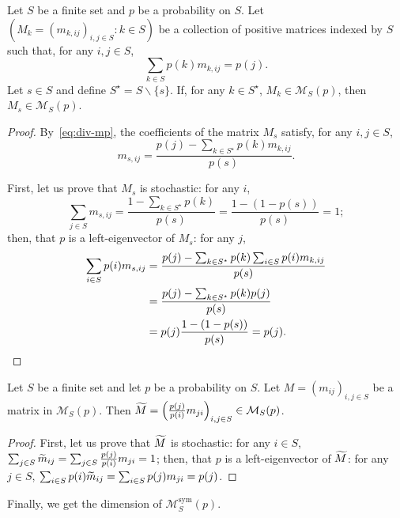 \documentclass[AHL,Unicode,longabstracts]{cedram}
\let\oldtilde\tilde
\renewcommand*{\tilde}[1]{\mathchoice{\widetilde{#1}}{\widetilde{#1}}{\oldtilde{#1}}{\oldtilde{#1}}}
\newcounter{a}
\DeclareMathOperator{\sym}{sym}
\begin{document}
\begin{lemm}\label{lem:div-mp}
Let $S$ be a finite set and $p$ be a probability on $S$. Let $(M_k= (m_{k,ij})_{i,j \in S}:k\in S)$ be a collection of positive matrices indexed by $S$ such that, for any $i,j \in S$,
\begin{equation}\label{eq:div-mp}
\sum_{k \in S} p(k) m_{k,ij} = p(j).
\end{equation}
Let $s \in S$ and define $S^\star = S \backslash \{s\}$. If, for any $k \in S^\star$, $M_k \in \mathcal{M}_S(p)$, then $M_s \in \mathcal{M}_S(p)$.
\end{lemm}

\begin{proof}
By~\eqref{eq:div-mp}, the coefficients of the matrix $M_s$ satisfy, for any $i,j \in S$,
\[
m_{s,ij} = \frac{p(j) - \sum_{k \in S^\star} p(k) m_{k,ij}}{p(s)}.
\]

First, let us prove that $M_s$ is stochastic: for any $i$,
\[
\sum_{j\in S} m_{s,ij} = \frac{1 - \sum_{k\in S^\star} p(k)}{p(s)} = \frac{1 - (1-p(s))}{p(s)} =1;
\]
then, that $p$ is a left-eigenvector of $M_s$: for any $j$,
\begin{align*}
\sum_{i \in S} p(i) m_{s,ij} & = \frac{p(j) - \sum_{k \in S^\star} p(k) \sum_{i\in S} p(i) m_{k,ij}}{p(s)}\\
& = \frac{p(j) - \sum_{k \in S^\star} p(k) p(j)}{p(s)}\\
& = p(j) \frac{1 - (1-p(s))}{p(s)} =p(j).\qedhere
\end{align*}
\end{proof}

\begin{lemm}\label{lem:div-rev}
Let $S$ be a finite set and let $p$ be a probability on $S$. Let $M= (m_{ij})_{i,j \in S}$ be a matrix in $\mathcal{M}_S(p)$. Then $\tilde{M} = \left(\frac{p(j)}{p(i)} m_{ji}\right)_{i,j \in S} \in \mathcal{M}_S(p)$.
\end{lemm}

\begin{proof}
First, let us prove that $\tilde{M}$ is stochastic: for any $i\in S$, $\sum_{j \in S} \tilde{m}_{ij}= \sum_{j \in S} \frac{p(j)}{p(i)} m_{ji} = 1$; then, that $p$ is a left-eigenvector of $\tilde{M}$: for any $j\in S$, $\sum_{i \in S} p(i)\linebreak\tilde{m}_{ij} = \sum_{i \in S} p(j) m_{ji} = p(j)$.
\end{proof}

Finally, we get the dimension of $\mathcal{M}^{\sym}_S(p)$.
\end{document}
